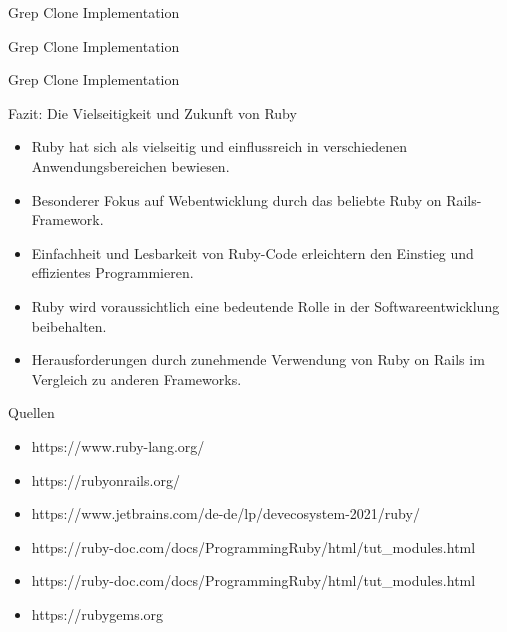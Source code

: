 \documentclass{beamer}
\begin{document}
\begin{frame}{Grep Clone Implementation}

\end{frame}
\begin{frame}{Grep Clone Implementation}

\end{frame}
\begin{frame}{Grep Clone Implementation}

\end{frame}
\begin{frame}{Fazit: Die Vielseitigkeit und Zukunft von Ruby}
  \begin{itemize}
    \item Ruby hat sich als vielseitig und einflussreich in verschiedenen Anwendungsbereichen bewiesen.
 
    \item Besonderer Fokus auf Webentwicklung durch das beliebte Ruby on Rails-Framework.
    \item Einfachheit und Lesbarkeit von Ruby-Code erleichtern den Einstieg und effizientes Programmieren.
    \item Ruby wird voraussichtlich eine bedeutende Rolle in der Softwareentwicklung beibehalten.
    \item Herausforderungen durch zunehmende Verwendung von Ruby on Rails im Vergleich zu anderen Frameworks.
   
  \end{itemize}
\end{frame}
\begin{frame}{Quellen}
  \begin{itemize}
    \item https://www.ruby-lang.org/
    \item https://rubyonrails.org/
    \item https://www.jetbrains.com/de-de/lp/devecosystem-2021/ruby/
    \item https://ruby-doc.com/docs/ProgrammingRuby/html/tut\_modules.html
    \item https://ruby-doc.com/docs/ProgrammingRuby/html/tut\_modules.html
  \item https://rubygems.org
  \end{itemize}
\end{frame}
\end{document}
